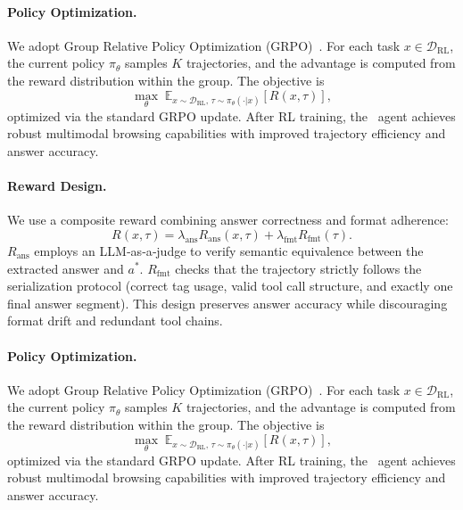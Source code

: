 \paragraph{Policy Optimization.}
We adopt Group Relative Policy Optimization (GRPO)~\citep{shao2024deepseekmath}. For each task $x\in\mathcal{D}_{\mathrm{RL}}$, the current policy $\pi_\theta$ samples $K$ trajectories, and the advantage is computed from the reward distribution within the group. The objective is
\begin{equation}
\max_{\theta}\; \mathbb{E}_{x\sim\mathcal{D}_{\mathrm{RL}},\,\tau\sim\pi_\theta(\cdot|x)}\left[R(x,\tau)\right],
\end{equation}
optimized via the standard GRPO update. After RL training, the \modelname\ agent achieves robust multimodal browsing capabilities with improved trajectory efficiency and answer accuracy.


\paragraph{Reward Design.}
We use a composite reward combining answer correctness and format adherence:
\begin{equation}
R(x,\tau)=\lambda_{\mathrm{ans}}R_{\mathrm{ans}}(x,\tau)+\lambda_{\mathrm{fmt}}R_{\mathrm{fmt}}(\tau).
\end{equation}
$R_{\mathrm{ans}}$ employs an LLM‑as‑a‑judge to verify semantic equivalence between the extracted answer and $a^*$. $R_{\mathrm{fmt}}$ checks that the trajectory strictly follows the serialization protocol (correct tag usage, valid tool call structure, and exactly one final answer segment). This design preserves answer accuracy while discouraging format drift and redundant tool chains.

\paragraph{Policy Optimization.}
We adopt Group Relative Policy Optimization (GRPO)~\citep{shao2024deepseekmath}. For each task $x\in\mathcal{D}_{\mathrm{RL}}$, the current policy $\pi_\theta$ samples $K$ trajectories, and the advantage is computed from the reward distribution within the group. The objective is
\begin{equation}
\max_{\theta}\; \mathbb{E}_{x\sim\mathcal{D}_{\mathrm{RL}},\,\tau\sim\pi_\theta(\cdot|x)}\left[R(x,\tau)\right],
\end{equation}
optimized via the standard GRPO update. After RL training, the \modelname\ agent achieves robust multimodal browsing capabilities with improved trajectory efficiency and answer accuracy.




